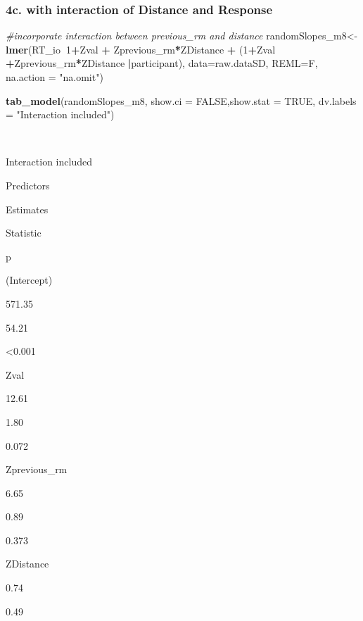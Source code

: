 \documentclass[
]{article}
\newenvironment{Shaded}{\begin{snugshade}}{\end{snugshade}}
\newcommand{\CommentTok}[1]{\textcolor[rgb]{0.56,0.35,0.01}{\textit{#1}}}
\newcommand{\DataTypeTok}[1]{\textcolor[rgb]{0.13,0.29,0.53}{#1}}
\newcommand{\DecValTok}[1]{\textcolor[rgb]{0.00,0.00,0.81}{#1}}
\newcommand{\KeywordTok}[1]{\textcolor[rgb]{0.13,0.29,0.53}{\textbf{#1}}}
\newcommand{\NormalTok}[1]{#1}
\newcommand{\OperatorTok}[1]{\textcolor[rgb]{0.81,0.36,0.00}{\textbf{#1}}}
\newcommand{\OtherTok}[1]{\textcolor[rgb]{0.56,0.35,0.01}{#1}}
\newcommand{\StringTok}[1]{\textcolor[rgb]{0.31,0.60,0.02}{#1}}
\begin{document}
\hypertarget{c.-with-interaction-of-distance-and-response}{%
\subsubsection{4c. with interaction of Distance and
Response}\label{c.-with-interaction-of-distance-and-response}}

\begin{Shaded}
\begin{Highlighting}[]
\CommentTok{#incorporate interaction between previous_rm and distance}
\NormalTok{randomSlopes_m8<-}\KeywordTok{lmer}\NormalTok{(RT_io}\OperatorTok{~}\DecValTok{1}\OperatorTok{+}\NormalTok{Zval }\OperatorTok{+}\StringTok{ }\NormalTok{Zprevious_rm}\OperatorTok{*}\NormalTok{ZDistance }\OperatorTok{+}\StringTok{ }\NormalTok{(}\DecValTok{1}\OperatorTok{+}\NormalTok{Zval }\OperatorTok{+}\NormalTok{Zprevious_rm}\OperatorTok{*}\NormalTok{ZDistance }\OperatorTok{|}\NormalTok{participant), }
                      \DataTypeTok{data=}\NormalTok{raw.dataSD, }
                      \DataTypeTok{REML=}\NormalTok{F,}
                      \DataTypeTok{na.action =} \StringTok{"na.omit"}\NormalTok{)}

\KeywordTok{tab_model}\NormalTok{(randomSlopes_m8, }\DataTypeTok{show.ci =} \OtherTok{FALSE}\NormalTok{,}\DataTypeTok{show.stat =} \OtherTok{TRUE}\NormalTok{, }\DataTypeTok{dv.labels =} \StringTok{"Interaction included"}\NormalTok{)}
\end{Highlighting}
\end{Shaded}

~

Interaction included

Predictors

Estimates

Statistic

p

(Intercept)

571.35

54.21

\textless0.001

Zval

12.61

1.80

0.072

Zprevious\_rm

6.65

0.89

0.373

ZDistance

0.74

0.49
\end{document}
